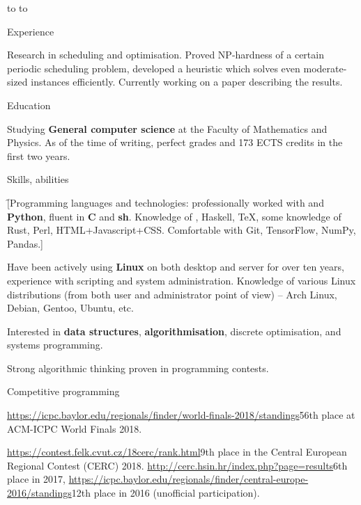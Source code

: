 


\newdimen\hei
\hei=1.5cm
\doublecolumns
 \vbox to 
 \vbox to 
\endcolumns

\doublecolumns

\sekce Experience

Research in scheduling and optimisation. Proved NP-hardness of a certain
periodic scheduling problem, developed a heuristic which solves even
moderate-sized instances efficiently. Currently working on a paper describing
the results.

\sekce Education


Studying {\bf General computer science} at the Faculty of Mathematics and
Physics. As of the time of writing, perfect grades and 173 ECTS credits in the
first two years.

\sekce Skills, abilities

\f[Programming languages and technologies: professionally worked with {\bf
\Cpp} and {\bf Python}, fluent in {\bf C} and {\bf sh}. Knowledge of \Cis,
Haskell, \TeX, some knowledge of Rust, Perl, HTML+Javascript+CSS. Comfortable
with Git, TensorFlow, NumPy, Pandas.]

Have been actively using {\bf Linux} on both desktop and server for over ten
years, experience with scripting and system administration. Knowledge of
various Linux distributions (from both user and administrator point of view) –
Arch Linux, Debian, Gentoo, Ubuntu, etc.

Interested in {\bf data structures}, {\bf algorithmisation}, discrete
optimisation, and systems programming.

Strong algorithmic thinking proven in programming contests.

\sekce Competitive programming

\url{https://icpc.baylor.edu/regionals/finder/world-finals-2018/standings}{56th
place} at ACM-ICPC World Finals 2018.

\url{https://contest.felk.cvut.cz/18cerc/rank.html}{9th place} in the Central
European Regional Contest (CERC) 2018.
\url{http://cerc.hsin.hr/index.php?page=results}{6th place} in 2017,
\url{https://icpc.baylor.edu/regionals/finder/central-europe-2016/standings}{12th
place} in 2016 (unofficial participation).

